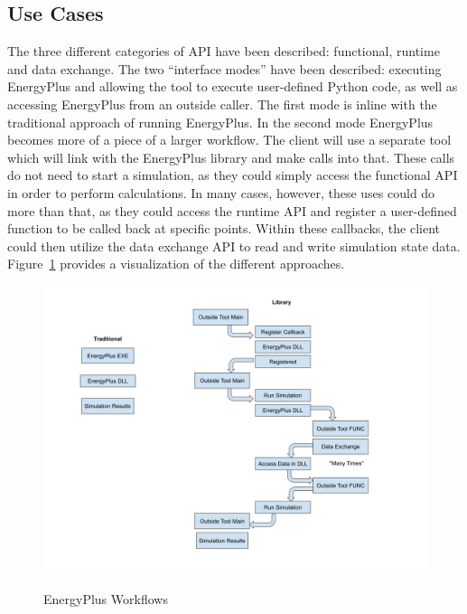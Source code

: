 \documentclass[5p]{elsarticle}
\begin{document}
  \subsection{Use Cases}
The three different categories of API have been described: functional, runtime and data exchange.  The two “interface modes” have been described: executing EnergyPlus and allowing the tool to execute user-defined Python code, as well as accessing EnergyPlus from an outside caller.  The first mode is inline with the traditional approach of running EnergyPlus.  In the second mode EnergyPlus becomes more of a piece of a larger workflow.  The client will use a separate tool which will link with the EnergyPlus library and make calls into that.  These calls do not need to start a simulation, as they could simply access the functional API in order to perform calculations.  In many cases, however, these uses could do more than that, as they could access the runtime API and register a user-defined function to be called back at specific points.  Within these callbacks, the client could then utilize the data exchange API to read and write simulation state data.  Figure~\ref{figure:api:uses:workflows} provides a visualization of the different approaches.

\begin{figure}
\begin{center}
\label{figure:api:uses:workflows}
\includegraphics[width=\columnwidth]{images/api_workflows.png}
\caption{EnergyPlus Workflows}
\end{center}
\end{figure}
\end{document}
